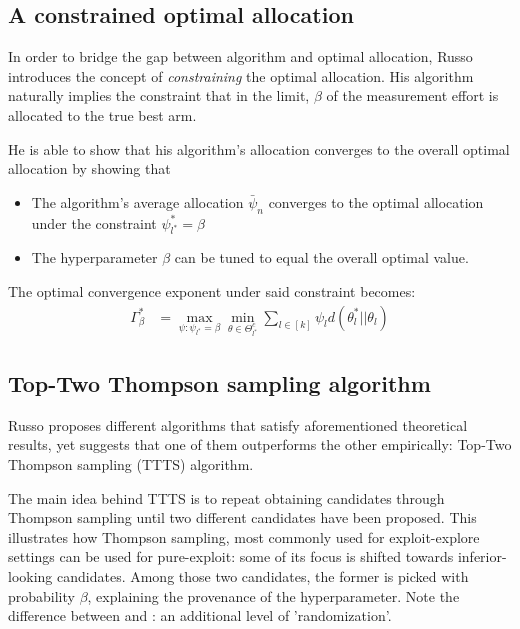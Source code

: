 \subsection{A constrained optimal allocation}

In order to bridge the gap between algorithm and optimal allocation, Russo
introduces the concept of \emph{constraining} the optimal allocation. His
algorithm naturally implies the constraint that in the limit, $\beta$ of the
measurement effort is allocated to the true best arm.

He is able to show that his algorithm's allocation converges to the overall
optimal allocation by showing that
\begin{itemize}
  \item The algorithm's average allocation $\bar{\psi}_n$ converges to the
  optimal allocation under the constraint $\psi_{l^*}^* = \beta$
  \item The hyperparameter $\beta$ can be tuned to equal the overall optimal
  value.
\end{itemize}
The optimal convergence exponent under said constraint becomes:
\begin{align}
  \Gamma^*_{\beta} &= \max_{\psi: \psi_{l^*} = \beta} \min_{\theta \in
      \Theta^c_{l^*}} \sum_{l \in [k]} \psi_l d(\theta_l^* || \theta_l)
\end{align}

\subsection{Top-Two Thompson sampling algorithm}

Russo proposes different algorithms that satisfy aforementioned theoretical
results, yet suggests that one of them outperforms the other empirically:
Top-Two Thompson sampling (TTTS) algorithm.

The main idea behind TTTS is to repeat obtaining candidates through Thompson
sampling until two different candidates have been proposed. This illustrates how
Thompson sampling, most commonly used for exploit-explore settings can be
used for pure-exploit: some of its focus is shifted towards inferior-looking
candidates. Among those two candidates, the former is picked with probability
$\beta$, explaining the provenance of the hyperparameter. Note the difference
between  and : an additional level of
'randomization'.

